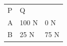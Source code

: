 \begin{enumerate}[noitemsep, label=\textbf{\arabic*}. ]
{\begin{tabular}[t]{|l|l|l|}
        P &
    
    
        Q%
     \tabularnewline\cline{1-1}\cline{2-2}\cline{3-3}
    
    
        A &
    
    
        100 N &
    
    
        0 N%
     \tabularnewline\cline{1-1}\cline{2-2}\cline{3-3}
    
    
        B &
    
    
        25 N &
    
    
        75 N%
     \tabularnewline\cline{1-1}\cline{2-2}\cline{3-3}
    

\end{tabular}}
\end{enumerate}

